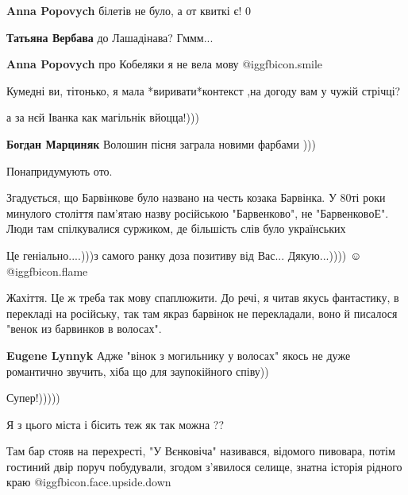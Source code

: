 \begin{itemize}
\begin{itemize}
\textbf{Anna Popovych} білетів не було, а от квиткі є! 0

\textbf{Татьяна Вербава} до Лашадінава? Гммм...

\textbf{Anna Popovych} про Кобеляки я не вела мову @igg{fbicon.smile} 

Кумедні ви, тітонько, я мала *виривати*контекст ,на догоду вам у чужій стрічці?
\end{itemize} %

а за нєй Іванка как магільнік вйоцца!)))

\begin{itemize} %
\textbf{Богдан Марциняк} Волошин пісня заграла новими фарбами )))
\end{itemize} %

Понапридумують ото.

Згадується, що Барвінкове було названо на честь козака Барвінка.
У 80ті роки минулого століття пам'ятаю назву російською "Барвенково", не "БарвенковоЕ". Люди там спілкувалися суржиком, де більшість слів було українських

Це геніально....)))з самого ранку доза позитиву від Вас... Дякую...)))) ☺ ️  @igg{fbicon.flame} 


Жахіття. Це ж треба так мову спаплюжити. До речі, я читав якусь фантастику, в
перекладі на російську, так там якраз барвінок не перекладали, воно й писалося
"венок из барвинков в волосах".

\begin{itemize} %
\textbf{Eugene Lynnyk}
Адже "вінок з могильнику у волосах" якось не дуже романтично звучить, хіба що для заупокійного співу))
\end{itemize} %

Супер!)))))

Я з цього міста і бісить теж як так можна ??


Там бар стояв на перехресті, "У Вєнковіча" називався, відомого пивовара, потім
гостиний двір поруч побудували, згодом з'явилося селище, знатна історія рідного
краю  @igg{fbicon.face.upside.down} 




\end{itemize}

